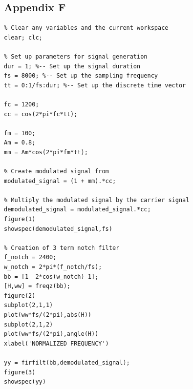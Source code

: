\documentclass{article}
\begin{document}
\newpage

\subsection{Appendix F}

\begin{lstlisting}
% Clear any variables and the current workspace
clear; clc;

% Set up parameters for signal generation
dur = 1; %-- Set up the signal duration
fs = 8000; %-- Set up the sampling frequency
tt = 0:1/fs:dur; %-- Set up the discrete time vector

fc = 1200;
cc = cos(2*pi*fc*tt);

fm = 100;
Am = 0.8;
mm = Am*cos(2*pi*fm*tt);

% Create modulated signal from 
modulated_signal = (1 + mm).*cc;

% Multiply the modulated signal by the carrier signal
demodulated_signal = modulated_signal.*cc;
figure(1)
showspec(demodulated_signal,fs)

% Creation of 3 term notch filter
f_notch = 2400;
w_notch = 2*pi*(f_notch/fs);
bb = [1 -2*cos(w_notch) 1];
[H,ww] = freqz(bb);
figure(2)
subplot(2,1,1)
plot(ww*fs/(2*pi),abs(H))
subplot(2,1,2)
plot(ww*fs/(2*pi),angle(H))
xlabel('NORMALIZED FREQUENCY')

yy = firfilt(bb,demodulated_signal);
figure(3)
showspec(yy)
\end{lstlisting}
\end{document}
